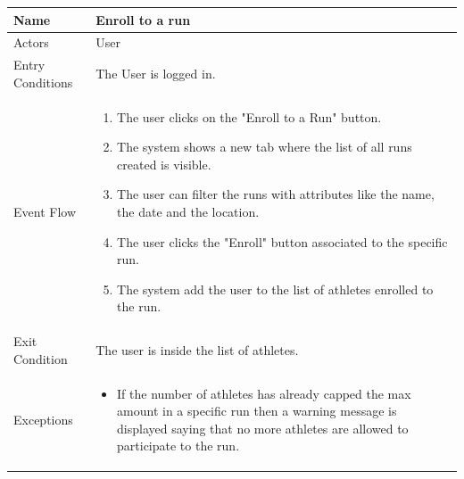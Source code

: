 \begin{enumerate}
\FloatBarrier
\begin{table}[h]
\begin{tabular}{|l|p{}|}
\hline
Name             & Enroll to a run \\ \hline
Actors           & User  \\ \hline
Entry Conditions & The User is logged in.    \\ \hline
Event Flow       & \begin{enumerate}
            \item The user clicks on the "Enroll to a Run" button.
            \item The system shows a new tab where the list of all runs created is visible.
            \item The user can filter the runs with attributes like the name, the date and the location.
            \item The user clicks the "Enroll" button associated to the specific run.
            \item The system add the user to the list of athletes enrolled to the run.
        \end{enumerate}\\ \hline
Exit Condition   & The user is inside the list of athletes.\\ \hline
Exceptions       & \begin{itemize}
\item If the number of athletes has already capped the max amount in a specific run then a warning message is displayed saying that no more athletes are allowed to participate to the run.
\end{itemize}\\ \hline
\end{tabular}
\end{table}
\FloatBarrier


\end{enumerate}
